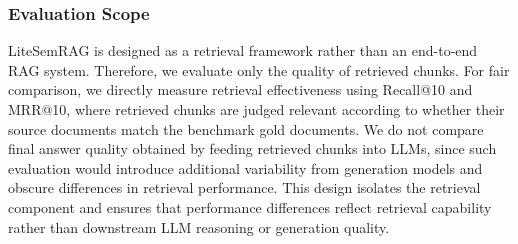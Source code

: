 \documentclass[conference]{IEEEtran}
\begin{document}
\subsubsection{Evaluation Scope}
LiteSemRAG is designed as a retrieval framework rather than an end-to-end RAG system. Therefore, we evaluate only the quality of retrieved chunks. For fair comparison, we directly measure retrieval effectiveness using Recall@10 and MRR@10, where retrieved chunks are judged relevant according to whether their source documents match the benchmark gold documents. We do not compare final answer quality obtained by feeding retrieved chunks into LLMs, since such evaluation would introduce additional variability from generation models and obscure differences in retrieval performance. This design isolates the retrieval component and ensures that performance differences reflect retrieval capability rather than downstream LLM reasoning or generation quality.
\end{document}
